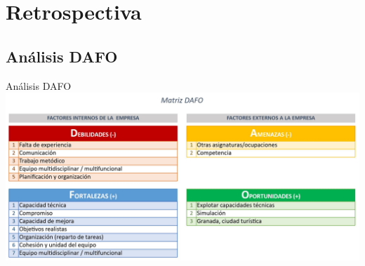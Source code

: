 \documentclass{beamer}
\begin{document}
\section{Retrospectiva}

\subsection{An\'alisis DAFO}

\begin{frame}{An\'alisis DAFO}
	\includegraphics[width=0.8\paperwidth, height=0.8\paperheight]{images_latex/DAFO}
	  
\end{frame}
\end{document}
